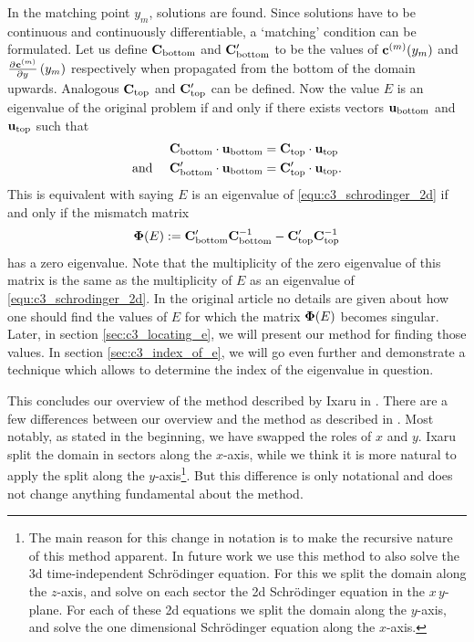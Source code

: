 In the matching point $y_m$, solutions are found. Since solutions have to be continuous and continuously differentiable, a `matching' condition can be formulated.  Let us define $\vb{C}_\text{bottom}$ and $\vb{C}_\text{bottom}'$ to be the values of $\vb{c}^{(m)}(y_m)$ and $\pdv[]{\vb{c}^{(m)}}{y}\left(y_m\right)$ respectively when propagated from the bottom of the domain upwards. Analogous $\vb{C}_\text{top}$ and $\vb{C}_\text{top}'$ can be defined. Now the value $E$ is an eigenvalue of the original problem if and only if there exists vectors $\vb{u}_\text{bottom}$ and $\vb{u}_\text{top}$ such that
\begin{align*}
    \vb{C}_\text{bottom} \cdot \vb{u}_\text{bottom}                   & = \vb{C}_\text{top} \cdot \vb{u}_\text{top}           \\
    \text{and }\quad \vb{C}_\text{bottom}' \cdot \vb{u}_\text{bottom} & = \vb{C}_\text{top}' \cdot \vb{u}_\text{top} \text{.}
\end{align*}
This is equivalent with saying $E$ is an eigenvalue of \eqref{equ:c3_schrodinger_2d} if and only if the mismatch matrix
\begin{equation}\label{equ:c3_psi_e}
    \vb{\Phi}(E) := \vb{C}_\text{bottom}'\vb{C}_\text{bottom}^{-1} - \vb{C}_\text{top}'\vb{C}_\text{top}^{-1}
\end{equation}
has a zero eigenvalue. Note that the multiplicity of the zero eigenvalue of this matrix is the same as the multiplicity of $E$ as an eigenvalue of \eqref{equ:c3_schrodinger_2d}. In the original article no details are given about how one should find the values of $E$ for which the matrix $\vb{\Phi}(E)$ becomes singular. Later, in section \ref{sec:c3_locating_e}, we will present our method for finding those values. In section \ref{sec:c3_index_of_e}, we will go even further and demonstrate a technique which allows to determine the index of the eigenvalue in question.

This concludes our overview of the method described by Ixaru in \cite{ixaru_new_2010}. There are a few differences between our overview and the method as described in \cite{ixaru_new_2010}. Most notably, as stated in the beginning, we have swapped the roles of $x$ and $y$. Ixaru split the domain in sectors along the $x$-axis, while we think it is more natural to apply the split along the $y$-axis\footnote{The main reason for this change in notation is to make the recursive nature of this method apparent. In future work we use this method to also solve the 3d time-independent Schrödinger equation. For this we split the domain along the $z$-axis, and solve on each sector the 2d Schrödinger equation in the $x\,y$-plane. For each of these 2d equations we split the domain along the $y$-axis, and solve the one dimensional Schrödinger equation along the $x$-axis.}. But this difference is only notational and does not change anything fundamental about the method.


